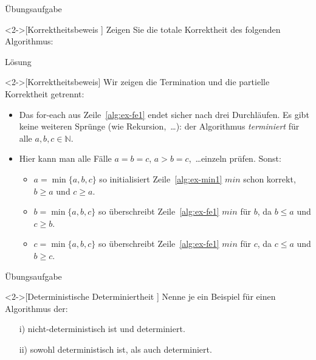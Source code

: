 \begin{frame}[c]{Übungsaufgabe}
    \begin{exercise}<2->[Korrektheitsbeweis ]
        Zeigen Sie die totale Korrektheit des folgenden Algorithmus:\smallskip\par
{}
    \end{exercise}
\end{frame}

\begin{frame}[c]{Lösung}
    \begin{solve}<2->[Korrektheitsbeweis]
       \pause{}Wir zeigen die Termination und die partielle Korrektheit getrennt: \begin{itemize}[<+(1)->]
           \item Das for-each aus Zeile~\ref{alg:ex-fe1} endet sicher nach drei Durchläufen. Es gibt keine weiteren Sprünge (wie Rekursion,~\ldots): der Algorithmus \emph{terminiert} für alle \(a, b, c \in \mathbb{N}\).
           \item Hier kann man alle Fälle \(a = b = c\), \(a > b = c\),~\ldots einzeln prüfen. Sonst: \begin{itemize}
             \item \(a = \min\{a, b, c\}\) so initialisiert Zeile~\ref{alg:ex-min1} \(min\) schon korrekt, \(b \geq a\) und \(c \geq a\).
             \item \(b = \min\{a, b, c\}\) so überschreibt Zeile~\ref{alg:ex-fe1} \(min\) für \(b\), da \(b \leq a\) und \(c \geq b\).
             \item \(c = \min\{a, b, c\}\) so überschreibt Zeile~\ref{alg:ex-fe1} \(min\) für \(c\), da \(c \leq a\) und \(b \geq c\).
           \end{itemize}
       \end{itemize}
    \end{solve}
\end{frame}

\begin{frame}[c]{Übungsaufgabe}
    \begin{exercise}<2->[Deterministische Determiniertheit ]
        \pause{}Nenne je ein Beispiel für einen Algorithmus der:
        \begin{enumerate}[<+(1)->]
            \item[i)] nicht-deterministisch ist und determiniert.
            \item[ii)] sowohl deterministisch ist, als auch determiniert.
        \end{enumerate}
    \end{exercise}
\end{frame}

